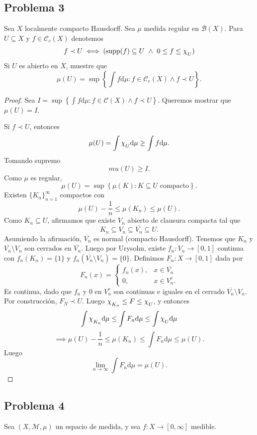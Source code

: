 \documentclass{article}
\theoremstyle{definition}
\theoremstyle{remark}
\numberwithin{equation}{section}
\newcommand{\B}{\mathcal{B}}
\newcommand{\M}{\mathcal{M}}
\newcommand{\Ccal}{\mathcal{C}}
\renewcommand{\d}{\mathrm{d}}
\newcommand{\oo}{\infty}
\renewcommand{\bar}{\overline}
\newcommand{\set}[1]{\left\{ #1 \right\}}
\newcommand{\Chi}[1]{\chi_{\raisebox{-.5ex}{$\scriptstyle #1$}}}
\begin{document}
\newpage
\subsection{Problema 3}

Sea $X$ localmente compacto Hausdorff. Sea $\mu$ medida regular en $\B(X)$. Para $U \subseteq X$ y $f \in \Ccal_c(X)$ denotemos 
\[ f \prec U \iff (\mathrm{supp}(f) \subseteq U \ \land \ 0 \leq f \leq \Chi{U}) \]
Si $U$ es abierto en $X$, muestre que 
\[ \mu(U) = \sup\set{\int f\d\mu \colon f \in \Ccal_c(X) \land f \prec U}. \]

\begin{proof}
  Sea $I = \sup\set{\int f \d\mu \colon f \in \Ccal(X) \land f \prec U}$. Queremos mostrar que $\mu(U) = I$.

  Si $f \prec U$, entonces $$\mu(U) = \int \Chi U \d\mu \geq \int f \d\mu.$$
  Tomando supremo 
  \[ mu(U) \geq I. \]
  Como $\mu$ es regular, 
  \[ \mu(U) = \sup\set{\mu(K) \colon K \subseteq U \text{ compacto}}. \]
  Existen $\{K_n\}_{n=1}^\oo$ compactos con 
  \[ \mu(U) - \frac{1}{n} \leq \mu(K_n) \leq \mu(U). \]
  Como $K_n \subseteq U$, afirmamos que existe $V_n$ abierto de clausura compacta tal que 
  \[ K_n \subseteq V_n \subseteq \bar{V_n} \subseteq U. \]
  Asumiendo la afirmación, $\bar{V_n}$ es normal (compacto Hausdorff).
  Tenemos que $K_n$ y $\bar{V_n} \setminus V_n$ son cerrados en $\bar{V_n}$. Luego por Urysohn, existe $f_n \colon V_n \to [0,1]$ continua con $f_n(K_n) = \{1\}$ y $f_n(\bar{V_n} \setminus V_n) = \{0\}$.
  Definimos $F_n \colon X \to [0,1]$ dada por 
  \[ F_n(x) = \begin{cases}
    f_n(x), &x \in \bar{V_n} \\
    0, &x \in V_n^c.
  \end{cases} \]
  Es continua, dado que $f_n$ y 0 en $V_n^c$ son continuas e iguales en el cerrado $\bar{V_n} \setminus V_n$. Por construcción, $F_N \prec U$. Luego $\Chi{K_n} \leq F \leq \Chi{U}$, y entonces 
  \[ \int \Chi{K_n} \d\mu \leq \int F_n \d\mu \leq \int \Chi{U} \d\mu \]
  \[\implies \mu(U) - \frac{1}{n} \leq \mu(K_n) \leq \int F_n \d\mu \leq \mu(U).\]
  Luego 
  \[ \lim_{n\to\oo} \int F_n \d\mu = \mu(U). \]
\end{proof}

\newpage
\subsection{Problema 4}

Sea $(X,\M,\mu)$ un espacio de medida, y sea $f \colon X \to [0,\oo]$ medible.
\end{document}
